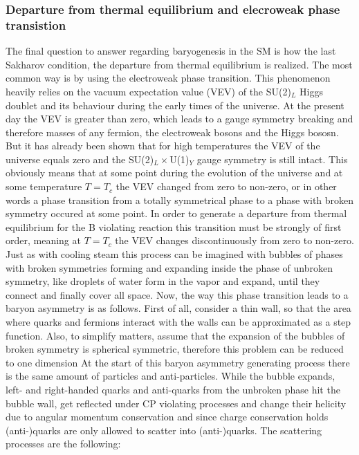 \subsubsection{Departure from thermal equilibrium and elecroweak phase transistion} The final question to answer regarding baryogenesis in the SM is how the last Sakharov condition, the departure from thermal equilibrium is realized. The most common way is by using the electroweak phase transition. \newline\indent
This phenomenon heavily relies on the vacuum expectation value (VEV) of the SU(2)$_L$ Higgs doublet and its behaviour during the early times of the universe. At the present day the VEV is greater than zero, which leads to a gauge symmetry breaking and therefore masses of any fermion, the electroweak bosons and the Higgs bososn. But it has already been shown \cite[p. 21]{Bernreuther:2002uj} that for high temperatures the VEV of the universe equals zero and the SU(2)$_L\times$U(1)$_Y$ gauge symmetry is still intact. This obviously means that at some point during the evolution of the universe and at some temperature $T=T_c$ the VEV changed from zero to non-zero, or in other words a phase transition from a totally symmetrical phase to a phase with broken symmetry occured at some point. In order to generate a departure from thermal equilibrium for the B violating reaction this transition must be strongly of first order, meaning at $T=T_c$ the VEV changes discontinuously from zero to non-zero. \newline\indent
Just as with cooling steam this process can be imagined with bubbles of phases with broken symmetries forming and expanding inside the phase of unbroken symmetry, like droplets of water form in the vapor and expand, until they connect and finally cover all space. Now, the way this phase transition leads to a baryon asymmetry is as follows. \newline\indent
First of all, consider a thin wall, so that the area where quarks and fermions interact with the walls can be approximated as a step function. Also, to simplify matters, assume that the expansion of the bubbles of broken symmetry is spherical symmetric, therefore this problem can be reduced to one dimension\cite[p. 33]{Bernreuther:2002uj} \newline\indent
At the start of this baryon asymmetry generating process there is the same amount of particles and anti-particles. \newline\indent
While the bubble expands, left- and right-handed quarks and anti-quarks from the unbroken phase hit the bubble wall, get reflected under CP violating processes and change their helicity due to angular momentum conservation and since charge conservation holds (anti-)quarks are only allowed to scatter into (anti-)quarks. The scattering processes are the following:
